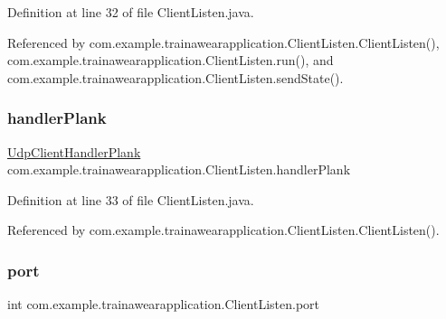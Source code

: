 Definition at line 32 of file Client\+Listen.\+java.



Referenced by com.\+example.\+trainawearapplication.\+Client\+Listen.\+Client\+Listen(), com.\+example.\+trainawearapplication.\+Client\+Listen.\+run(), and com.\+example.\+trainawearapplication.\+Client\+Listen.\+send\+State().

\mbox{\label{classcom_1_1example_1_1trainawearapplication_1_1_client_listen_ad3b38ad71c2120e19c5f820053863a64}} 
\subsubsection{\texorpdfstring{handlerPlank}{handlerPlank}}
{\footnotesize\ttfamily \mbox{\hyperlink{classcom_1_1example_1_1trainawearapplication_1_1_udp_client_handler_plank}{Udp\+Client\+Handler\+Plank}} com.\+example.\+trainawearapplication.\+Client\+Listen.\+handler\+Plank\hspace{0.3cm}{\ttfamily [package]}}



Definition at line 33 of file Client\+Listen.\+java.



Referenced by com.\+example.\+trainawearapplication.\+Client\+Listen.\+Client\+Listen().

\mbox{\label{classcom_1_1example_1_1trainawearapplication_1_1_client_listen_a9835e7e202b86f8b019671b86508313a}} 
\subsubsection{\texorpdfstring{port}{port}}
{\footnotesize\ttfamily int com.\+example.\+trainawearapplication.\+Client\+Listen.\+port\hspace{0.3cm}{\ttfamily [private]}}




